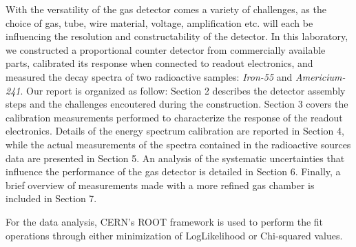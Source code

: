 With the versatility of the gas detector comes a variety of challenges, as the choice of gas, tube, wire material, voltage, amplification etc. will each be influencing the resolution and constructability of the detector. In this laboratory, we constructed a proportional counter detector from commercially available parts, calibrated its response when connected to readout electronics, and measured the decay spectra of two radioactive samples: \emph{Iron-55} and \emph{Americium-241}. Our report is organized as follow: Section 2 describes the detector assembly steps and the challenges encoutered during the construction. Section 3 covers the calibration measurements performed to characterize the response of the readout electronics. Details of the energy spectrum calibration are reported in Section 4, while the actual measurements of the spectra contained in the radioactive sources data are presented in Section 5. An analysis of the systematic uncertainties that influence the performance of the gas detector is detailed in Section 6. Finally, a brief overview of measurements made with a more refined gas chamber is included in Section 7.

For the data analysis, CERN's ROOT framework\cite{Brun:1997pa} is used to perform the fit operations through either minimization of LogLikelihood or Chi-squared values.
